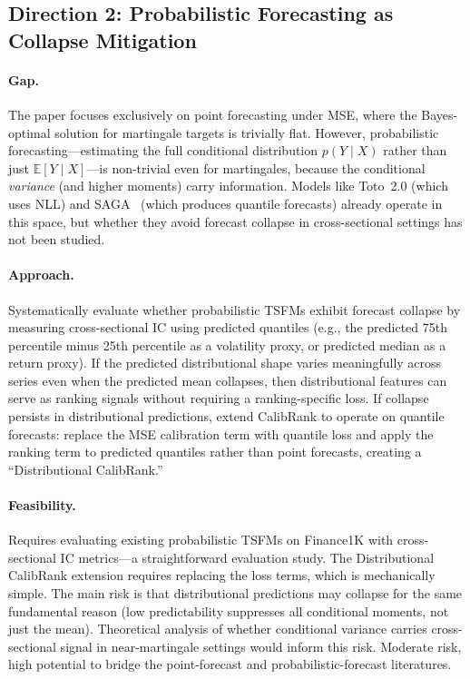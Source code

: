 \documentclass[11pt,a4paper]{article}
\begin{document}
\subsection{Direction 2: Probabilistic Forecasting as Collapse Mitigation}

\paragraph{Gap.} The paper focuses exclusively on point forecasting under MSE, where the Bayes-optimal solution for martingale targets is trivially flat. However, probabilistic forecasting---estimating the full conditional distribution $p(Y \mid X)$ rather than just $\mathbb{E}[Y \mid X]$---is non-trivial even for martingales, because the conditional \emph{variance} (and higher moments) carry information. Models like Toto~2.0 (which uses NLL) and SAGA~\cite{saga2026} (which produces quantile forecasts) already operate in this space, but whether they avoid forecast collapse in cross-sectional settings has not been studied.

\paragraph{Approach.} Systematically evaluate whether probabilistic TSFMs exhibit forecast collapse by measuring cross-sectional IC using predicted quantiles (e.g., the predicted 75th percentile minus 25th percentile as a volatility proxy, or predicted median as a return proxy). If the predicted distributional shape varies meaningfully across series even when the predicted mean collapses, then distributional features can serve as ranking signals without requiring a ranking-specific loss. If collapse persists in distributional predictions, extend CalibRank to operate on quantile forecasts: replace the MSE calibration term with quantile loss and apply the ranking term to predicted quantiles rather than point forecasts, creating a ``Distributional CalibRank.''

\paragraph{Feasibility.} Requires evaluating existing probabilistic TSFMs on Finance1K with cross-sectional IC metrics---a straightforward evaluation study. The Distributional CalibRank extension requires replacing the loss terms, which is mechanically simple. The main risk is that distributional predictions may collapse for the same fundamental reason (low predictability suppresses all conditional moments, not just the mean). Theoretical analysis of whether conditional variance carries cross-sectional signal in near-martingale settings would inform this risk. Moderate risk, high potential to bridge the point-forecast and probabilistic-forecast literatures.
\end{document}
